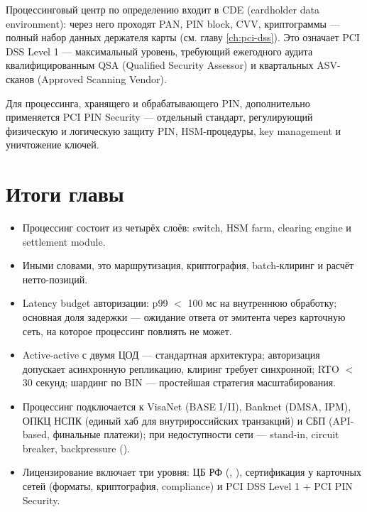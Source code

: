 Процессинговый центр по определению входит в CDE (cardholder
data environment): через него проходят PAN, PIN block,
CVV, криптограммы — полный набор данных держателя
карты (см. главу \ref{ch:pci-dss}). Это означает PCI DSS
Level 1 — максимальный уровень, требующий ежегодного
аудита квалифицированным QSA (Qualified Security Assessor)
и квартальных ASV-сканов (Approved Scanning Vendor).

Для процессинга, хранящего и обрабатывающего PIN, дополнительно
применяется PCI PIN Security — отдельный стандарт, регулирующий
физическую и логическую защиту PIN, HSM-процедуры, key management
и уничтожение ключей.

\section*{Итоги главы}

\begin{itemize}
  \item Процессинг состоит из четырёх слоёв:
        switch, HSM farm, clearing engine
        и settlement module.
  \item Иными словами, это маршрутизация, криптография,
        batch-клиринг и расчёт нетто-позиций.
  \item Latency budget авторизации: p99 $<$ 100 мс на внутреннюю обработку; основная доля задержки — ожидание ответа от
        эмитента через карточную сеть, на которое процессинг повлиять не может.
  \item Active-active с двумя ЦОД — стандартная архитектура; авторизация допускает асинхронную репликацию, клиринг требует
        синхронной; RTO $<$ 30 секунд; шардинг по BIN — простейшая стратегия масштабирования.
  \item Процессинг подключается к VisaNet (BASE I/II),
        Banknet (DMSA, IPM), ОПКЦ НСПК (единый хаб
        для внутрироссийских транзакций) и СБП (API-based,
        финальные платежи); при недоступности сети —
        stand-in, circuit breaker, backpressure ().
  \item Лицензирование включает три уровня: ЦБ РФ
        (, ), сертификация
        у карточных сетей (форматы, криптография, compliance)
        и PCI DSS Level 1 + PCI PIN Security.
\end{itemize}
